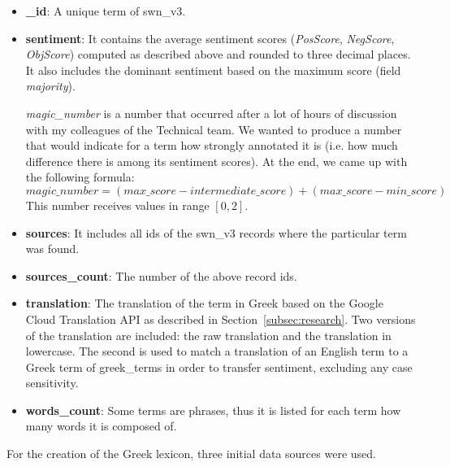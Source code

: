 \begin{itemize}
 \item \textbf{\_id}: A unique term of swn\_v3.

 \item \textbf{sentiment}: It contains the average sentiment scores
 (\emph{PosScore}, \emph{NegScore}, \emph{ObjScore}) computed as described above
 and rounded to three decimal places.
 It also includes the dominant sentiment based on the maximum score
 (field \emph{majority}).

 \emph{magic\_number} is a number that occurred after a lot of hours
 of discussion with my colleagues of the Technical team.
 We wanted to produce a number that would indicate for a term
 how strongly annotated it is
 (i.e. how much difference there is among its sentiment scores).
 At the end, we came up with the following formula: \\
 $magic\_number = (max\_score - intermediate\_score) + (max\_score - min\_score)$ \\
 This number receives values in range $[0,2]$.
 
 \item \textbf{sources}: It includes all ids of the swn\_v3 records
 where the particular term was found.
 
 \item \textbf{sources\_count}: The number of the above record ids.
 
 \item \textbf{translation}: The translation of the term in Greek
 based on the Google Cloud Translation API
 as described in Section~\ref{subsec:research}.
 Two versions of the translation are included:
 the raw translation and the translation in lowercase.
 The second is used to match a translation of an English term
 to a Greek term of greek\_terms in order to transfer sentiment,
 excluding any case sensitivity.
 
 \item \textbf{words\_count}: Some terms are phrases, thus
 it is listed for each term how many words it is composed of.
\end{itemize}

\label{subsubsubsec:greek-terms}

For the creation of the Greek lexicon,
three initial data sources were used.

